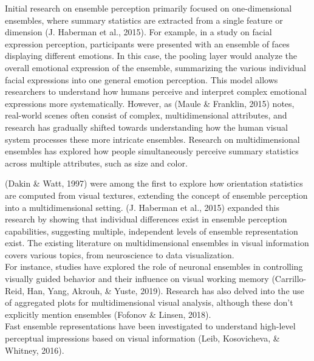 \documentclass[print]{nuthesis}
\begin{document}
Initial research on ensemble perception primarily focused on one-dimensional ensembles, where summary statistics are extracted from a single feature or dimension (J. Haberman et al., 2015).
For example, in a study on facial expression perception, participants were presented with an ensemble of faces displaying different emotions.
In this case, the pooling layer would analyze the overall emotional expression of the ensemble, summarizing the various individual facial expressions into one general emotion perception.
This model allows researchers to understand how humans perceive and interpret complex emotional expressions more systematically.
However, as (Maule \& Franklin, 2015) notes, real-world scenes often consist of complex, multidimensional attributes, and research has gradually shifted towards understanding how the human visual system processes these more intricate ensembles.
Research on multidimensional ensembles has explored how people simultaneously perceive summary statistics across multiple attributes, such as size and color.

(Dakin \& Watt, 1997) were among the first to explore how orientation statistics are computed from visual textures, extending the concept of ensemble perception into a multidimensional setting.
(J. Haberman et al., 2015) expanded this research by showing that individual differences exist in ensemble perception capabilities, suggesting multiple, independent levels of ensemble representation exist.
The existing literature on multidimensional ensembles in visual information covers various topics, from neuroscience to data visualization.\\
For instance, studies have explored the role of neuronal ensembles in controlling visually guided behavior and their influence on visual working memory (Carrillo-Reid, Han, Yang, Akrouh, \& Yuste, 2019).
Research has also delved into the use of aggregated plots for multidimensional visual analysis, although these don't explicitly mention ensembles (Fofonov \& Linsen, 2018).\\
Fast ensemble representations have been investigated to understand high-level perceptual impressions based on visual information (Leib, Kosovicheva, \& Whitney, 2016).
\end{document}
